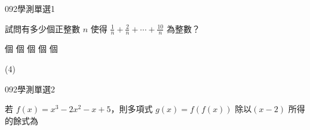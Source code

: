 \begin{QUESTIONS}
    \begin{QUESTION}
        \begin{ExamInfo}{092}{學測}{單選}{1}
        \end{ExamInfo}
        \begin{ExamAnsRateInfo}{46}{74}{46}{18}
        \end{ExamAnsRateInfo}
        \begin{QBODY}
            試問有多少個正整數 $n$ 使得 $ \frac{1}{n} + \frac{2}{n} + \cdots + \frac{10}{n}$ 為整數？ 
            \begin{QOPS} 
                 個 
                 個  
                 個 
                 個 
                 個
            \end{QOPS}
        \end{QBODY}
        \begin{QFROMS}
        \end{QFROMS}
        \begin{QTAGS}\end{QTAGS}
        \begin{QANS}
            (4)
        \end{QANS}
        \begin{QSOLLIST}
        \end{QSOLLIST}
        \begin{QEMPTYSPACE}
        \end{QEMPTYSPACE}
    \end{QUESTION}
    \begin{QUESTION}
        \begin{ExamInfo}{092}{學測}{單選}{2}
        \end{ExamInfo}
        \begin{ExamAnsRateInfo}{46}{83}{44}{11}
        \end{ExamAnsRateInfo}
        \begin{QBODY}
            若 $f(x)=x^3 - 2x^2 -x +5$，則多項式 $g(x)=f(f(x))$ 除以$(x-2)$ 所得的餘式為 
            \begin{QOPS} 
            \end{QOPS}
        \end{QBODY}
        \begin{QFROMS}
        \end{QFROMS}

\end{QUESTION}
\end{QUESTIONS}
